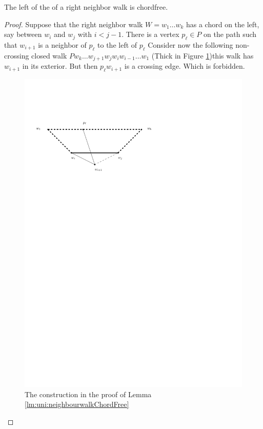     \begin{lemma}
      \label{lm:uni:neighbourwalkChordFree}
      The left of the of a right neighbor walk is chordfree.
    \end{lemma}
    \begin{proof}
      Suppose that the right neighbor walk $W = w_1 \ldots w_k$  has a chord on the left, say between $w_i$ and $w_j$ with $i< j -1 $. There is a vertex $p_\ell \in P$ on the path such that $w_{i+1}$ is a neighbor of $p_\ell$ to the left of $p_\ell$ Consider now the following non-crossing closed walk $P w_k \ldots w_{j+1} w_j w_i w_{i-1} \ldots w_1$
      (Thick in Figure \ref{fig:uni:neihbourwalkChordFree})this walk has $w_{i+1}$ in its exterior. But then $p_\ell w_{i+1}$ is a crossing edge. Which is forbidden.

      \begin{figure}[h]
        \centering
        \includegraphics[scale=1]{unifiedAlgo/img/neighbourWalkChords}
        \caption{The construction in the proof of Lemma \ref{lm:uni:neighbourwalkChordFree}}
        \label{fig:uni:neihbourwalkChordFree}
      \end{figure}
    \end{proof}

